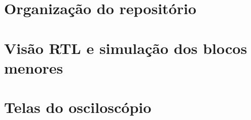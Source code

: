 
\maketitle	%



\frontmatter
\maketitlepage		%
\approval			%
\dedication			%
\acknowledgment		%
\printepigraph		%
\printabstract		%
\printengabstract	%
\printlof			%
\printlot			%
\printloa			%
\printtoc			%


\mainmatter
\acresetall	%







\backmatter
\printbibliography

\appendix
\chapter{Organização do repositório}\label{ap:repositorio}

\chapter{Visão RTL e simulação dos blocos menores}\label{ap:blocos}

\chapter{Telas do osciloscópio}\label{ap:osciloscopio}

